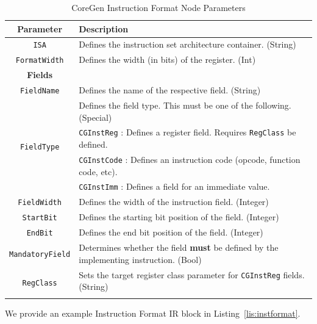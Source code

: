 \documentclass{article}
\begin{document}
\begin{table}[h]
\begin{center}
\caption{CoreGen Instruction Format Node Parameters}
\vspace{0.125in}
\label{tab:InstFormatParams}
\begin{tabular}{|c|l|}
\hline
\textbf{Parameter} & \textbf{Description}\\
\hline
\texttt{ISA} & Defines the instruction set architecture container. (String)\\
\hline
\texttt{FormatWidth} & Defines the width (in bits) of the register. (Int)\\
\hline
\hline
\textbf{Fields} & \\
\hline
\texttt{FieldName} & Defines the name of the respective field. (String)\\
\hline
\multirow{4}{*}{\texttt{FieldType}} & Defines the field type.  This must be one of the following. (Special)\\
                                                            & \texttt{CGInstReg} : Defines a register field.  Requires \texttt{RegClass} be defined.\\
                                                            & \texttt{CGInstCode} : Defines an instruction code (opcode, function code, etc).\\
                                                            & \texttt{CGInstImm} : Defines a field for an immediate value.\\
\hline
\texttt{FieldWidth} & Defines the width of the instruction field. (Integer)\\
\hline
\texttt{StartBit} & Defines the starting bit position of the field. (Integer)\\
\hline
\texttt{EndBit} & Defines the end bit position of the field. (Integer)\\
\hline
\texttt{MandatoryField} & Determines whether the field \textbf{must} be defined by the implementing instruction. (Bool)\\
\hline
\multirow{2}{*}{\texttt{RegClass}} & Sets the target register class parameter for \texttt{CGInstReg} fields.  (String)\\ & \\
\hline
\end{tabular}
\end{center}
\end{table} 

We provide an example Instruction Format IR block in Listing~\ref{lis:instformat}.  
\end{document}
